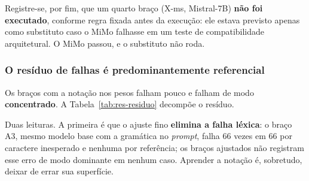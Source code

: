 Registre-se, por fim, que um quarto braço (X-ms, Mistral-7B) \textbf{não foi executado}, conforme regra fixada antes da execução: ele estava previsto apenas como substituto caso o MiMo falhasse em um teste de compatibilidade arquitetural. O MiMo passou, e o substituto não roda.

\subsubsection*{O resíduo de falhas é predominantemente referencial}

Os braços com a notação nos pesos falham pouco e falham de modo \textbf{concentrado}. A Tabela~\ref{tab:res-residuo} decompõe o resíduo.

\begin{table}[h!]
\end{table}

Duas leituras. A primeira é que o ajuste fino \textbf{elimina a falha léxica}: o braço A3, mesmo modelo base com a gramática no \textit{prompt}, falha 66 vezes em 66 por caractere inesperado e nenhuma por referência; os braços ajustados não registram esse erro de modo dominante em nenhum caso. Aprender a notação é, sobretudo, deixar de errar sua superfície.

